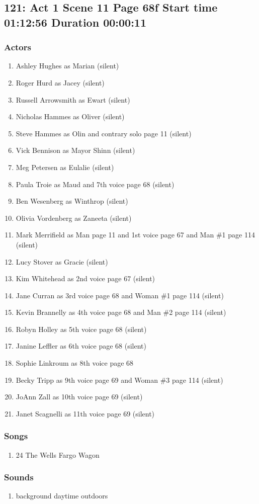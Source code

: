 \subsection{121: Act 1 Scene 11 Page 68f Start time 01:12:56 Duration 00:00:11}

\subsubsection{Actors}
\begin{enumerate}
\item Ashley Hughes as Marian (silent)
\item Roger Hurd as Jacey (silent)
\item Russell Arrowsmith as Ewart (silent)
\item Nicholas Hammes as Oliver (silent)
\item Steve Hammes as Olin and contrary solo page 11 (silent)
\item Vick Bennison as Mayor Shinn (silent)
\item Meg Petersen as Eulalie (silent)
\item Paula Troie as Maud and 7th voice page 68 (silent)
\item Ben Wesenberg as Winthrop (silent)
\item Olivia Vordenberg as Zaneeta (silent)
\item Mark Merrifield as Man page 11 and 1st voice page 67 and Man \#1 page 114 (silent)
\item Lucy Stover as Gracie (silent)
\item Kim Whitehead as 2nd voice page 67 (silent)
\item Jane Curran as 3rd voice page 68 and Woman \#1 page 114 (silent)
\item Kevin Brannelly as 4th voice page 68 and Man \#2 page 114 (silent)
\item Robyn Holley as 5th voice page 68 (silent)
\item Janine Leffler as 6th voice page 68 (silent)
\item Sophie Linkroum as 8th voice page 68
\item Becky Tripp as 9th voice page 69 and Woman \#3 page 114 (silent)
\item JoAnn Zall as 10th voice page 69 (silent)
\item Janet Scagnelli as 11th voice page 69 (silent)
\end{enumerate}

\subsubsection{Songs}
\begin{enumerate}
\item 24 The Wells Fargo Wagon
\end{enumerate}\subsubsection{Sounds}
\begin{enumerate}
\item background daytime outdoors
\end{enumerate}
